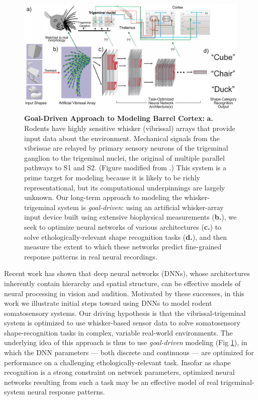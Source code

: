 \begin{figure}
\FigCenter
\includegraphics[width=\SchFigSize\linewidth]{figures/schematic.pdf}
\vspace{-3mm}
\caption{\footnotesize{\textbf{Goal-Driven Approach to Modeling Barrel Cortex:} \textbf{a.} Rodents have highly sensitive whisker (vibrissal) arrays that provide input data about the environment. Mechanical signals from the vibrissae are relayed by primary sensory neurons of the trigeminal ganglion to the trigeminal nuclei, the original of multiple parallel pathways to S1 and S2. (Figure modified from \cite{deschenes2009vibrissal}.) This system is a prime target for modeling because it is likely to be richly representational, but its computational underpinnings are largely unknown. Our long-term approach to modeling the whisker-trigeminal system is \emph{goal-driven}: using an artificial whisker-array input device built using extensive biophysical measurements (\textbf{b.}), we seek to optimize neural networks of various architectures (\textbf{c.}) to solve ethologically-relevant shape recognition tasks (\textbf{d.}), and then measure the extent to which these networks predict fine-grained response patterns in real neural recordings.} ~\label{fig_schematic}}
\vspace{-5mm}
\end{figure}

Recent work has shown that deep neural networks (DNNs), whose architectures inherently contain hierarchy and spatial structure, can be effective models of neural processing in vision\cite{Yamins2014,khaligh2014deep} and audition\cite{kell_yamins_sfn}.
Motivated by these successes, in this work we illustrate initial steps toward using DNNs to model rodent somatosensory systems.
Our driving hypothesis is that the vibrissal-trigeminal system is optimized to use whisker-based sensor data to solve somatosensory shape-recognition tasks in complex, variable real-world environments.
The underlying idea of this approach is thus to use \emph{goal-driven} modeling (Fig \ref{fig_schematic}), in which the DNN parameters --- both discrete and continuous --- are optimized for performance on a challenging ethologically-relevant task\cite{yamins2016using}.
Insofar as shape recognition is a strong constraint on network parameters, optimized neural networks resulting from such a task may be an effective model of real trigeminal-system neural response patterns.

